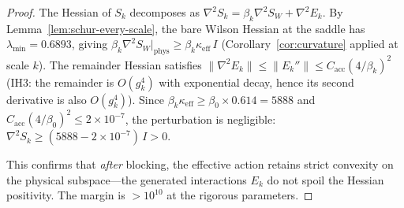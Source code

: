 \documentclass[11pt]{article}
\theoremstyle{definition}
\begin{document}
\begin{proof}
The Hessian of $S_k$ decomposes as
$\nabla^2 S_k=\beta_k\nabla^2 S_W+\nabla^2 E_k$.
By Lemma~\ref{lem:schur-every-scale}, the bare Wilson Hessian
at the saddle has $\lambda_{\min}=0.6893$, giving
$\beta_k\nabla^2 S_W\big|_{\mathrm{phys}}
\ge\beta_k\kappa_{\mathrm{eff}}\,I$
(Corollary~\ref{cor:curvature} applied at scale $k$).
The remainder Hessian satisfies
$\|\nabla^2 E_k\|\le\|E_k''\|
\le C_{\mathrm{acc}}(4/\beta_k)^2$
(IH3: the remainder is $O(g_k^4)$ with exponential decay,
hence its second derivative is also $O(g_k^4)$).
Since $\beta_k\kappa_{\mathrm{eff}}\ge\beta_0\times 0.614
=5888$ and $C_{\mathrm{acc}}(4/\beta_0)^2
\le 2\times 10^{-7}$, the perturbation is negligible:
$\nabla^2 S_k\ge(5888-2\times 10^{-7})\,I>0$.

This confirms that \emph{after} blocking, the effective action
retains strict convexity on the physical subspace---the
generated interactions $E_k$ do not spoil the Hessian positivity.
The margin is $>10^{10}$ at the rigorous parameters.
\end{proof}
\end{document}
